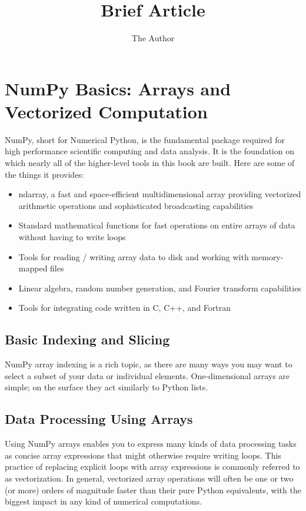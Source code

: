 \documentclass[11pt]{article} %
\title{Brief Article}
\author{The Author}
\begin{document}
\section{NumPy Basics: Arrays and Vectorized Computation}

NumPy, short for Numerical Python, is the fundamental package required for high
performance scientific computing and data analysis. It is the foundation on which
nearly all of the higher-level tools in this book are built. Here are some of the things it
provides:

\begin{itemize}
\item ndarray, a fast and space-efficient multidimensional array providing vectorized
arithmetic operations and sophisticated broadcasting capabilities
\item Standard mathematical functions for fast operations on entire arrays of data
without having to write loops
\item Tools for reading / writing array data to disk and working with memory-mapped
files
\item Linear algebra, random number generation, and Fourier transform capabilities
\item Tools for integrating code written in C, C++, and Fortran
\end{itemize}


\subsection{Basic Indexing and Slicing}
NumPy array indexing is a rich topic, as there are many ways you may want to select
a subset of your data or individual elements. One-dimensional arrays are simple; on
the surface they act similarly to Python lists.
\subsection{Data Processing Using Arrays}
Using NumPy arrays enables you to express many kinds of data processing tasks as
concise array expressions that might otherwise require writing loops. This practice of
replacing explicit loops with array expressions is commonly referred to as vectorization.
In general, vectorized array operations will often be one or two (or more) orders
of magnitude faster than their pure Python equivalents, with the biggest impact in any
kind of numerical computations.
\end{document}
